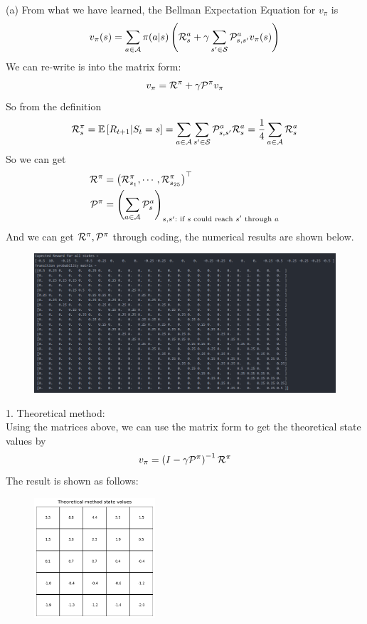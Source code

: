 \begin{homeworkProblem}
(a) From what we have learned, the Bellman Expectation Equation for $v_{\pi}$ is
$$v_{\pi}(s) = \sum_{a \in \mathcal{A}}\pi(a|s)\left(\mathcal{R}_s^a + \gamma \sum_{s' \in \mathcal{S}} \mathcal{P}_{s,s'}^a v_{\pi}(s)\right)$$
We can re-write is into the matrix form:
$$v_{\pi} = \mathcal{R}^{\pi} + \gamma \mathcal{P}^{\pi}v_{\pi}$$
So from the definition
$$\mathcal{R}_s^{\pi}=\mathbb{E}\left[R_{t+1}|S_t=s\right]=\sum_{a \in \mathcal{A}}\sum_{s'\in\mathcal{S}} \mathcal{P}_{s,s'}^a\mathcal{R}_s^a=\dfrac{1}{4}\sum_{a\in\mathcal{A}} \mathcal{R}_s^a$$
So we can get
\begin{align*}
\mathcal{R}^{\pi} &= \left(\mathcal{R}_{s_1}^{\pi},\cdots,\mathcal{R}_{s_{25}}^{\pi}\right)^{\top} \\
\mathcal{P}^{\pi} &= \left(\sum_{a\in\mathcal{A}}\mathcal{P}_s^{a}\right)_{s,s': \text{ if $s$ could reach $s'$ through $a$}}
\end{align*}
And we can get $\mathcal{R}^{\pi}, \mathcal{P}^{\pi}$ through coding, the numerical results are shown below.
\begin{figure}[h]
    \centering
    \includegraphics[width=\textwidth]{./figure/p3_output/uniform/theoritical_output.png}
\end{figure}

1. Theoretical method: \\
Using the matrices above, we can use the matrix form to get the theoretical state values by
$$v_{\pi} = \left(I-\gamma \mathcal{P}^{\pi}\right)^{-1}\mathcal{R}^{\pi}$$
The result is shown as follows:
\begin{figure}[h]
    \centering
    \includegraphics[width=0.4\textwidth]{./figure/p3_output/uniform/theoritical_values.png}
\end{figure}


\end{homeworkProblem}
